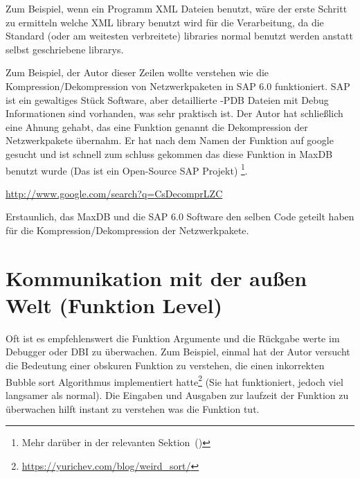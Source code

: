 Zum Beispiel, wenn ein Programm XML Dateien benutzt, w\"are der erste Schritt zu ermitteln welche
XML library benutzt wird f\"ur die Verarbeitung, da die Standard (oder am weitesten verbreitete) libraries
normal benutzt werden anstatt selbst geschriebene librarys.


Zum Beispiel, der Autor dieser Zeilen wollte verstehen wie die Kompression/Dekompression von Netzwerkpaketen in SAP 6.0 funktioniert.
SAP ist ein gewaltiges St\"uck Software, aber detaillierte -\gls{PDB} Dateien mit Debug Informationen sind vorhanden, was sehr praktisch 
ist. Der Autor hat schließlich eine Ahnung gehabt, das eine Funktion genannt  die Dekompression der Netzwerkpakete \"ubernahm.
Er hat nach dem Namen der Funktion auf google gesucht und ist schnell zum schluss gekommen das diese Funktion in 
MaxDB benutzt wurde (Das ist ein Open-Source SAP Projekt) \footnote{Mehr dar\"uber in der relevanten Sektion~()}. 

\url{http://www.google.com/search?q=CsDecomprLZC}

Erstaunlich, das MaxDB und die SAP 6.0 Software den selben Code geteilt haben f\"ur die Kompression/Dekompression der Netzwerkpakete.

 

\section{Kommunikation mit der außen Welt (Funktion Level)} 
Oft ist es empfehlenswert die Funktion Argumente und die R\"uckgabe werte im Debugger oder \ac{DBI} zu \"uberwachen.
Zum Beispiel, einmal hat der Autor versucht die Bedeutung einer obskuren Funktion zu verstehen, die einen inkorrekten
Bubble sort Algorithmus implementiert hatte\footnote{\url{https://yurichev.com/blog/weird_sort/}}
 (Sie hat funktioniert, jedoch viel langsamer als normal). Die Eingaben und Ausgaben zur laufzeit 
der Funktion zu \"uberwachen hilft instant zu verstehen was die Funktion tut.












